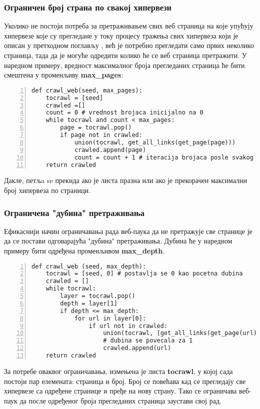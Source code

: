 		\subsubsection{Ограничен број страна по свакој хипервези}
		Уколико не постоји потреба за претраживањем свих веб страница на које упућују хипервезе које су прегледане у току процесу тражења свих хипервеза који је описан у претходном поглављу , већ је потребно прегледати само првих неколико страница, тада да је могуће одредити колико ће се веб страница претражити. У наредном примеру, вредност максималног броја прегледаних страница ће бити смештена у променљиву \textbf{max\_pages}:
		\begin{lstlisting}[caption=Претраживање са ограниченим бројем страна, label={lst:crawlweb2}, numbers=left]
def crawl_web(seed, max_pages):
    tocrawl = [seed]
    crawled =[]
    count = 0 # vrednost brojaca inicijalno na 0
    while tocrawl and count < max_pages:
        page = tocrawl.pop()
        if page not in crawled:
            union(tocrawl, get_all_links(get_page(page)))
            crawled.append(page)
            count = count + 1 # iteracija brojaca posle svakog linka
    return crawled
		\end{lstlisting}
		Дакле, петљa se прекида ако је листа празна или ако је прекорачен максимални број хипервеза по страници. 
		\subsubsection{Ограничена "дубина" претраживања}
		Ефикаснији начин ограничавања рада веб-паука да не претражује све странице је да се постави одговарајућа "дубина" претраживања. Дубина ће у наредном примеру бити одређена променљивом \textbf{max\_depth}.
		\begin{lstlisting}[caption=Скенирање ограничено по дубини, label={lst:crawlweb3}, numbers=left]
def crawl_web (seed, max_depth):
    tocrawl = [seed, 0] # postavlja se 0 kao pocetna dubina
    crawled = []
    while tocrawl:
        layer = tocrawl.pop()
        depth = layer[1]
        if depth <= max_depth:
            for url in layer[0]:
                if url not in crawled:
                    union(tocrawl, [get_all_links(get_page(url)),depth+1])
                    # dubina se povecala za 1
                    crawled.append(url)
    return crawled
		\end{lstlisting}
		За потребе оваквог ограничавања, измењена је листа \textbf{tocrawl}, у којој сада постоји пар елемената: страница и број. Број се повећава кад се прегледају све хипервезе са одређене странице и пређе на нову страну. Тако се  ограничава веб-паук да после одређеног броја прегледаних страница заустави свој рад.
		\pagebreak